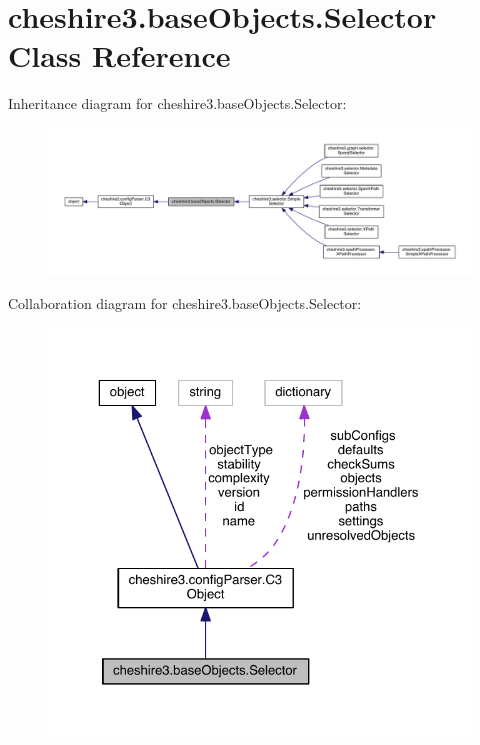 \hypertarget{classcheshire3_1_1base_objects_1_1_selector}{\section{cheshire3.\-base\-Objects.\-Selector Class Reference}
\label{classcheshire3_1_1base_objects_1_1_selector}
}


Inheritance diagram for cheshire3.\-base\-Objects.\-Selector\-:
\nopagebreak
\begin{figure}[H]
\begin{center}
\leavevmode
\includegraphics[width=350pt]{classcheshire3_1_1base_objects_1_1_selector__inherit__graph}
\end{center}
\end{figure}


Collaboration diagram for cheshire3.\-base\-Objects.\-Selector\-:
\nopagebreak
\begin{figure}[H]
\begin{center}
\leavevmode
\includegraphics[width=325pt]{classcheshire3_1_1base_objects_1_1_selector__coll__graph}
\end{center}
\end{figure}
